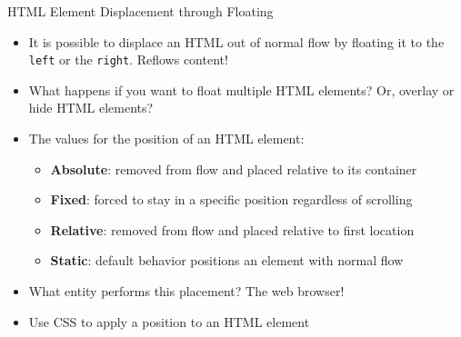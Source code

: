 \documentclass[14pt,aspectratio=169]{beamer}
\begin{document}
%
\begin{frame}{HTML Element Displacement through Floating}
  \begin{itemize}
    \item It is possible to displace an HTML out of normal flow by floating it
      to the {\tt left} or the {\tt right}. Reflows content!
      \vspace*{-.15in}
    \item What happens if you want to float multiple HTML elements? Or, overlay
      or hide HTML elements?
      \vspace*{-.15in}
    \item The values for the position of an HTML element:
      \begin{itemize}
        \item {\bf Absolute}: removed from flow and placed relative to its
          container
        \item {\bf Fixed}: forced to stay in a specific position regardless of
          scrolling
        \item {\bf Relative}: removed from flow and placed relative to first
          location
        \item {\bf Static}: default behavior positions an element with
          normal flow
      \end{itemize}
      \vspace*{-.2in}
    \item What entity performs this placement? The web browser!
      \vspace*{-.2in}
    \item Use CSS to apply a position to an HTML element
  \end{itemize}
\end{frame}
\end{document}
